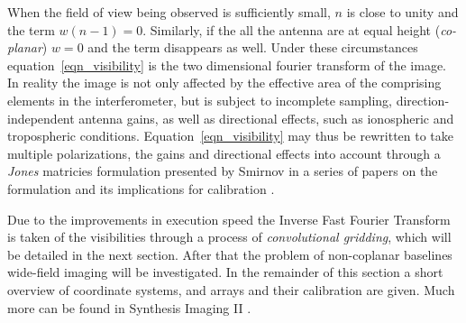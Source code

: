 \documentclass[a4paper,10pt]{report}
\begin{document}
When the field of view being observed is sufficiently small, $n$ is close to unity and the term $w(n-1) = 0$. Similarly, if the all the antenna are at equal height (\textit{co-planar}) $w=0$ and the term disappears as well.
Under these circumstances equation~\ref{eqn_visibility} is the two dimensional fourier transform of the image. In reality the image is not only affected by the effective area of the comprising elements in the interferometer, but is subject to incomplete sampling, 
direction-independent antenna gains, as well as directional effects, such as ionospheric and tropospheric conditions. Equation~\ref{eqn_visibility} may thus be rewritten to take multiple polarizations, the gains and directional effects into account through a \textit{Jones}
matricies formulation presented by Smirnov in a series of papers on the formulation and its implications for calibration \cite{2011A&A...527A.106S,2011A&A...527A.107S,2011A&A...527A.108S}.

Due to the improvements in execution speed the Inverse Fast Fourier Transform is taken of the visibilities through a process of \textit{convolutional gridding}, which will be detailed in the next section. After that the problem 
of non-coplanar baselines wide-field imaging will be investigated. In the remainder of this section a short overview of coordinate systems, and arrays and their calibration are given. Much more can be found in 
Synthesis Imaging II \cite[Lectures 2, 3, 8, 10]{taylor1999synthesis}.
\end{document}
